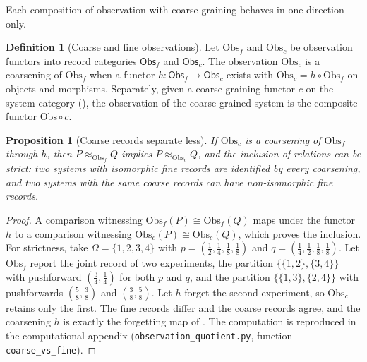 \documentclass[11pt,letterpaper]{article}
\newtheorem{proposition}[theorem]{Proposition}
\theoremstyle{definition}
\newtheorem{definition}[theorem]{Definition}
\theoremstyle{remark}
\begin{document}
Each composition of observation with coarse-graining behaves in one direction only.

\begin{definition}[Coarse and fine observations]
\label{def:coarse}
Let $\mathrm{Obs}_f$ and $\mathrm{Obs}_c$ be observation functors into record categories $\mathsf{Obs}_f$ and $\mathsf{Obs}_c$. The observation $\mathrm{Obs}_c$ is a coarsening of $\mathrm{Obs}_f$ when a functor $h \colon \mathsf{Obs}_f \to \mathsf{Obs}_c$ exists with $\mathrm{Obs}_c = h \circ \mathrm{Obs}_f$ on objects and morphisms. Separately, given a coarse-graining functor $c$ on the system category (), the observation of the coarse-grained system is the composite functor $\mathrm{Obs} \circ c$.
\end{definition}

\begin{proposition}[Coarse records separate less]
\label{prop:coarse}
If $\mathrm{Obs}_c$ is a coarsening of $\mathrm{Obs}_f$ through $h$, then $P \approx_{\mathrm{Obs}_f} Q$ implies $P \approx_{\mathrm{Obs}_c} Q$, and the inclusion of relations can be strict: two systems with isomorphic fine records are identified by every coarsening, and two systems with the same coarse records can have non-isomorphic fine records.
\end{proposition}

\begin{proof}
A comparison witnessing $\mathrm{Obs}_f(P) \cong \mathrm{Obs}_f(Q)$ maps under the functor $h$ to a comparison witnessing $\mathrm{Obs}_c(P) \cong \mathrm{Obs}_c(Q)$, which proves the inclusion. For strictness, take $\Omega = \{1,2,3,4\}$ with $p = (\tfrac{1}{2}, \tfrac{1}{4}, \tfrac{1}{8}, \tfrac{1}{8})$ and $q = (\tfrac{1}{4}, \tfrac{1}{2}, \tfrac{1}{8}, \tfrac{1}{8})$. Let $\mathrm{Obs}_f$ report the joint record of two experiments, the partition $\{\{1,2\}, \{3,4\}\}$ with pushforward $(\tfrac{3}{4}, \tfrac{1}{4})$ for both $p$ and $q$, and the partition $\{\{1,3\}, \{2,4\}\}$ with pushforwards $(\tfrac{5}{8}, \tfrac{3}{8})$ and $(\tfrac{3}{8}, \tfrac{5}{8})$. Let $h$ forget the second experiment, so $\mathrm{Obs}_c$ retains only the first. The fine records differ and the coarse records agree, and the coarsening $h$ is exactly the forgetting map of . The computation is reproduced in the computational appendix (\texttt{observation\_\allowbreak quotient.py}, function \texttt{coarse\_\allowbreak vs\_\allowbreak fine}).
\end{proof}
\end{document}
